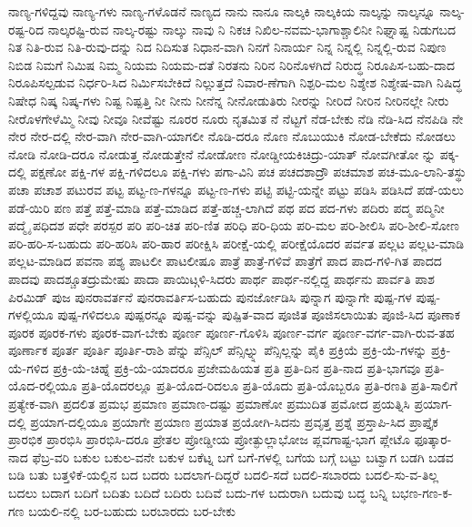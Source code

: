{ನಾಣ್ಯ-ಗಳಿದ್ದವು
ನಾಣ್ಯ-ಗಳು
ನಾಣ್ಯ-ಗಳೊಡನೆ
ನಾಣ್ಯದ
ನಾನು
ನಾನೂ
ನಾಲ್ಕಕಿ
ನಾಲ್ಕಕಿಯ
ನಾಲ್ಕನ್ನು
ನಾಲ್ಕನ್ನೂ
ನಾಲ್ಕ-ರಷ್ಟ-ರಿದ
ನಾಲ್ಕರಷ್ಟಿ-ರುವ
ನಾಲ್ಕ-ರಷ್ಟು
ನಾಲ್ಕು
ನಾವು
ನಿ
ನಿಕಚ
ನಿಖಿಲ-ನವಮ-ಭಾಗಾಶ್ಚಾಲಿನೀ
ನಿಘ್ನಾಷ್ಟ
ನಿಡುಗಬದ
ನಿತ
ನಿತಿ-ರುವ
ನಿತಿ-ರುವು-ದನ್ನು
ನಿದ
ನಿದಿಸುತ
ನಿಧಾನ-ವಾಗಿ
ನಿನಗೆ
ನಿನಾರ್ಯ
ನಿನ್ನ
ನಿನ್ನಲ್ಲಿ
ನಿನ್ನಲ್ಲಿ-ರುವ
ನಿಪುಣ
ನಿಬಿಡ
ನಿಮಗೆ
ನಿಮಿಷ
ನಿಮ್ಮ
ನಿಯಮ
ನಿಯಮ-ದತೆ
ನಿರತನು
ನಿರಿನ
ನಿರಿನೊಳಗಿದೆ
ನಿರುದ್ಧ
ನಿರೂಪಿಸ-ಬಹು-ದಾದ
ನಿರೂಪಿಸಲ್ಪಡುವ
ನಿರ್ಧರಿ-ಸಿದ
ನಿರ್ಮಿಸಬೇಕಿದೆ
ನಿಲ್ಲುತ್ತದೆ
ನಿವಾರ-ಣೆಗಾಗಿ
ನಿಶ್ಪರಿ-ಮಲ
ನಿಶ್ಶೇಶ
ನಿಶ್ಶೇಷ-ವಾಗಿ
ನಿಷಿದ್ಧ
ನಿಷೇಧ
ನಿಷ್ಕ
ನಿಷ್ಕ-ಗಳು
ನಿಷ್ಟ
ನಿಷ್ಪತ್ತಿ
ನೀ
ನೀನು
ನೀನೆನ್ನ
ನೀನೋಡುತಿರು
ನೀರನ್ನು
ನೀರಿದೆ
ನೀರಿನ
ನೀರಿನಲ್ಲೇ
ನೀರು
ನೀರೊಳಗೇಳೆಮ್ಮಿ
ನೀವು
ನೀವೂ
ನೀವೆಷ್ಟು
ನೂರರ
ನೂರು
ನೃತಮಿತ
ನೆ
ನೆಟ್ಟಗೆ
ನೆಡ-ಬೇಕು
ನೆಡಿ
ನೆಡಿ-ಸಿದ
ನೆನಪಿಡಿ
ನೇ
ನೇರ
ನೇರ-ದಲ್ಲಿ
ನೇರ-ವಾಗಿ
ನೇರ-ವಾಗಿ-ಯಾಗಲೀ
ನೊಡಿ-ದರೂ
ನೊಣ
ನೊಬುಯುಕಿ
ನೋಡ-ಬೇಕೆದು
ನೋಡಲು
ನೋಡಿ
ನೋಡಿ-ದರೂ
ನೋಡುತ್ತ
ನೋಡುತ್ತೇನೆ
ನೋಡೋಣ
ನೋಡ್ಡೀಯಕಿಚಿದ್ರು-ಯಾತ್
ನೋವಗೀತೋ
ನ್ನು
ಪಕ್ಕ-ದಲ್ಲಿ
ಪಕ್ಷಣೋ
ಪಕ್ಷಿ-ಗಳ
ಪಕ್ಷಿ-ಗಳಿದಲೂ
ಪಕ್ಷಿ-ಗಳು
ಪಗಾ-ವಿನಿ
ಪಚ
ಪಚದಶಾದ್ರೌ
ಪಚಮಾಶ
ಪಚ-ಮೂ-ಲಾನಿ-ತಸ್ಥು
ಪಚಾ
ಪಚಾಶ
ಪಟುರವ
ಪಟ್ಟ
ಪಟ್ಟ-ಣ-ಗಳನ್ನೂ
ಪಟ್ಟ-ಣ-ಗಳು
ಪಟ್ಟಿ
ಪಟ್ಟಿ-ಯನ್ನೇ
ಪಟ್ಟು
ಪಡಿಸಿ
ಪಡಿಸಿದೆ
ಪಡೆ-ಯಲು
ಪಡೆ-ಯಿರಿ
ಪಣ
ಪತ್ತೆ
ಪತ್ತೆ-ಮಾಡಿ
ಪತ್ತೆ-ಮಾಡಿದ
ಪತ್ತೆ-ಹಚ್ಚ-ಲಾಗಿದೆ
ಪಥ
ಪದ
ಪದ-ಗಳು
ಪದಿರು
ಪದ್ಮ
ಪದ್ಮಿನೀ
ಪದ್ಮೈ
ಪಧಿದಶ
ಪಧೇ
ಪರಸ್ಪರ
ಪರಿ
ಪರಿ-ಚಿತ
ಪರಿ-ಣಿತ
ಪರಿಧಿ
ಪರಿ-ಧಿಯ
ಪರಿ-ಮಲ
ಪರಿ-ಶೀಲಿಸಿ
ಪರಿ-ಶೀಲಿ-ಸೋಣ
ಪರಿ-ಹರಿ-ಸ-ಬಹುದು
ಪರಿ-ಹರಿಸಿ
ಪರಿ-ಹಾರ
ಪರೀಕ್ಷಿಸಿ
ಪರೀಕ್ಷೆ-ಯಲ್ಲಿ
ಪರೀಕ್ಷೆಯೊದರ
ಪರ್ವತ
ಪಲ್ಲಟ
ಪಲ್ಲಟ-ಮಾಡಿ
ಪಲ್ಲಟ-ಮಾಡಿದ
ಪವನಾ
ಪಶ್ಯ
ಪಾಟಲೀ
ಪಾಟಲೀಷೂ
ಪಾತ್ರೆ
ಪಾತ್ರೆ-ಗಳಿವೆ
ಪಾತ್ರೆಗೆ
ಪಾದ
ಪಾದ-ಗಳಿ-ಗಿತ
ಪಾದದ
ಪಾದವು
ಪಾದಶ್ಚೂತದ್ರುಮೇಷು
ಪಾದಾ
ಪಾಯಿಟ್ಗಳಿ-ಸಿದರು
ಪಾರ್ಥ
ಪಾರ್ಥ-ನಲ್ಲಿದ್ದ
ಪಾರ್ಥನು
ಪಾರ್ವತಿ
ಪಾಶ
ಪಿರಮಿಡ್
ಪುಜ
ಪುನರಾವರ್ತನೆ
ಪುನರಾವರ್ತಿಸ-ಬಹುದು
ಪುನರ್ಜೋಡಿಸಿ
ಪುನ್ನಾಗ
ಪುನ್ನಾಗೇ
ಪುಷ್ಪ-ಗಳ
ಪುಷ್ಪ-ಗಳಲ್ಲಿಯೂ
ಪುಷ್ಪ-ಗಳಿದಲೂ
ಪುಷ್ಪರನ್ನೂ
ಪುಷ್ಪ-ವನ್ನು
ಪುಷ್ಪಿತ-ವಾದ
ಪೂಜಿತ
ಪೂಜಿಸಲಾಯಿತು
ಪೂಜಿ-ಸಿದ
ಪೂಣಾಕ
ಪೂರಕ
ಪೂರಕ-ಗಳು
ಪೂರಕ-ವಾಗ-ಬೇಕು
ಪೂರ್ಣ
ಪೂರ್ಣ-ಗೊಳಿಸಿ
ಪೂರ್ಣ-ವರ್ಗ
ಪೂರ್ಣ-ವರ್ಗ-ವಾಗಿ-ರುವ-ತಹ
ಪೂರ್ಣಾಕ
ಪೂರ್ತ
ಪೂರ್ತಿ
ಪೂರ್ತಿ-ರಾಶಿ
ಪೆನ್ನು
ಪೆನ್ಸಿಲ್
ಪೆನ್ಸಿಲ್ನ್ನು
ಪೆನ್ಸಿಲ್ಲನ್ನು
ಪೈಕಿ
ಪ್ರಕ್ರಿಯೆ
ಪ್ರಕ್ರಿ-ಯೆ-ಗಳನ್ನು
ಪ್ರಕ್ರಿ-ಯೆ-ಗಳಿದ
ಪ್ರಕ್ರಿ-ಯೆ-ಚಿಹ್ನೆ
ಪ್ರಕ್ರಿ-ಯೆ-ಯಾದರೂ
ಪ್ರಜೇಮಹಿಯತ
ಪ್ರತಿ
ಪ್ರತಿ-ದಿನ
ಪ್ರತಿ-ನಾದ
ಪ್ರತಿ-ಭಾಗವೂ
ಪ್ರತಿ-ಯೊದ-ರಲ್ಲಿಯೂ
ಪ್ರತಿ-ಯೊದರಲ್ಲೂ
ಪ್ರತಿ-ಯೊದ-ರಿದಲೂ
ಪ್ರತಿ-ಯೊದು
ಪ್ರತಿ-ಯೊಬ್ಬರೂ
ಪ್ರತಿ-ರಣತಿ
ಪ್ರತಿ-ಸಾಲಿಗೆ
ಪ್ರತ್ಯೇಕ-ವಾಗಿ
ಪ್ರದಲಿತ
ಪ್ರಮಭ
ಪ್ರಮಾಣ
ಪ್ರಮಾಣ-ದಷ್ಟು
ಪ್ರಮಾಣೋ
ಪ್ರಮುದಿತ
ಪ್ರಮೋದ
ಪ್ರಯತ್ನಿಸಿ
ಪ್ರಯಾಗ-ದಲ್ಲಿ
ಪ್ರಯಾಗ-ದಲ್ಲಿಯೂ
ಪ್ರಯಾಗೇ
ಪ್ರಯಾಣ
ಪ್ರಯಾತ
ಪ್ರಯೋಗಿ-ಸಿದನು
ಪ್ರವೃತ್ತ
ಪ್ರಶ್ನೆ
ಪ್ರಸ್ತಾಪಿ-ಸಿದ
ಪ್ರಾಪ್ತೈಕ
ಪ್ರಾರಭಿಕ
ಪ್ರಾರಭಿಸಿ
ಪ್ರಾರಭಿಸಿ-ದರೂ
ಪ್ರೇತಲ
ಪ್ರೋಡ್ಡೀಯ
ಪ್ರೋತ್ಫುಲ್ಲಾಭೋಜ
ಪ್ಲವಗಾಷ್ಟ-ಭಾಗ
ಪ್ಲೇಟೊ
ಫೂತ್ಕಾರ-ನಾದ
ಫೆಬ್ರ-ವರಿ
ಬಕುಲ
ಬಕುಲ-ವನೇ
ಬಕುಳ
ಬಕೆಟ್ನ
ಬಗೆ
ಬಗೆ-ಗಳಲ್ಲಿ
ಬಗೆಯ
ಬಗ್ಗೆ
ಬಟ್ಟು
ಬಟ್ವಾಗ
ಬಡಗಿ
ಬಡವ
ಬಡಿ
ಬತು
ಬತ್ತಳಿಕೆ-ಯಲ್ಲಿನ
ಬದ
ಬದರು
ಬದಲಾಗ-ದಿದ್ದರೆ
ಬದಲಿ-ಸದೆ
ಬದಲಿ-ಸಬಾರದು
ಬದಲಿ-ಸು-ವ-ತಿಲ್ಲ
ಬದಲು
ಬದಾಗ
ಬದಿಗೆ
ಬದಿತು
ಬದಿದೆ
ಬದಿರು
ಬದಿವೆ
ಬದು-ಗಳ
ಬದುರಾಗಿ
ಬದುವು
ಬದ್ಧ
ಬನ್ನಿ
ಬಭಣ-ಗಣ-ಕ-ಗಣ
ಬಯಲಿ-ನಲ್ಲಿ
ಬರ-ಬಹುದು
ಬರಬಾರದು
ಬರ-ಬೇಕು
}
